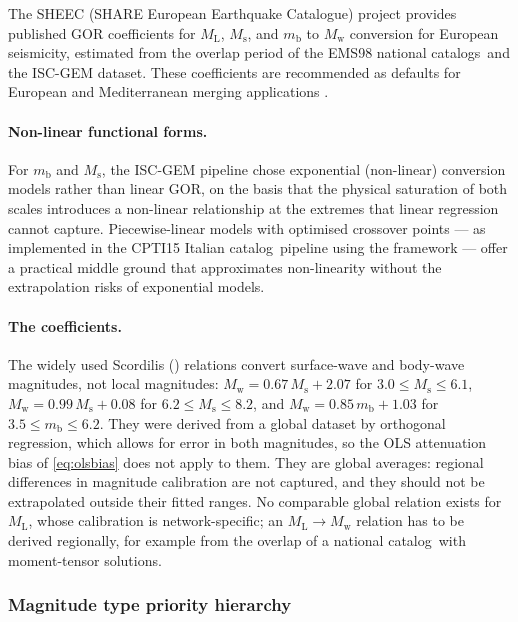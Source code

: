 \documentclass[12pt]{article}
\newcommand{\catalog}{catalog}
\newcommand{\catalogs}{catalogs}
\begin{document}
The SHEEC (SHARE European Earthquake Catalogue) project \citep{Grunthal2016}
provides published GOR coefficients for $M_\mathrm{L}$, $M_\mathrm{s}$, and
$m_\mathrm{b}$ to $M_\mathrm{w}$ conversion for European seismicity, estimated
from the overlap period of the EMS98 national \catalogs\ and the ISC-GEM
dataset.  These coefficients are recommended as defaults for European and
Mediterranean merging applications \citep{Grunthal2016}.

\paragraph{Non-linear functional forms.}
For $m_\mathrm{b}$ and $M_\mathrm{s}$, the ISC-GEM pipeline
\citep{ISCGEM2018} chose exponential (non-linear) conversion models rather than
linear GOR, on the basis that the physical saturation of both scales introduces
a non-linear relationship at the extremes that linear regression cannot capture.
Piecewise-linear models with optimised crossover points — as implemented in
the CPTI15 Italian \catalog\ pipeline using the \citet{Gasperini2012} framework
— offer a practical middle ground that approximates non-linearity without the
extrapolation risks of exponential models.

\paragraph{The \citet{Scordilis2006} coefficients.}
The widely used Scordilis (\citeyear{Scordilis2006}) relations convert
surface-wave and body-wave magnitudes, not local magnitudes:
$M_\mathrm{w} = 0.67\,M_\mathrm{s} + 2.07$ for $3.0 \leq M_\mathrm{s} \leq 6.1$,
$M_\mathrm{w} = 0.99\,M_\mathrm{s} + 0.08$ for $6.2 \leq M_\mathrm{s} \leq 8.2$,
and $M_\mathrm{w} = 0.85\,m_\mathrm{b} + 1.03$ for
$3.5 \leq m_\mathrm{b} \leq 6.2$.  They were derived from a global dataset by
orthogonal regression, which allows for error in both magnitudes, so the OLS
attenuation bias of \eqref{eq:olsbias} does not apply to them.  They are global
averages: regional differences in magnitude calibration are not captured, and
they should not be extrapolated outside their fitted ranges.  No comparable
global relation exists for $M_\mathrm{L}$, whose calibration is network-specific;
an $M_\mathrm{L} \to M_\mathrm{w}$ relation has to be derived regionally, for
example from the overlap of a national \catalog\ with moment-tensor solutions.

\subsubsection{Magnitude type priority hierarchy}
\label{sec:maghierarchy}
\end{document}
